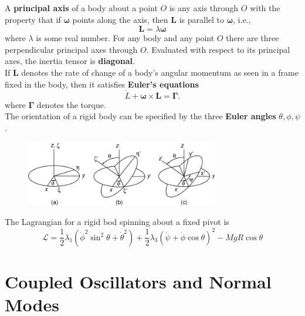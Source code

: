 \documentclass{book}
\theoremstyle{definition}
\newcommand{\lag}{\mathcal{L}}
\newcommand{\f}[2]{\frac{#1}{#2}}
\begin{document}
A \textbf{principal axis} of a body about a point $O$ is any axis through $O$ with the property that if $\mathbf{\omega}$ points along the axis, then $\mathbf{L}$ is parallel to $\mathbf{\omega}$, i.e., 
\begin{equation*}
\mathbf{L} = \lambda \mathbf{\omega}
\end{equation*}
where $\lambda$ is some real number. For any body and any point $O$ there are three perpendicular principal axes through $O$. Evaluated with respect to its principal axes, the inertia tensor is \textbf{diagonal}. \\


If $\dot{\mathbf{L}}$ denotes the rate of change of a body's angular momentum as seen in a frame fixed in the body, then it satisfies \textbf{Euler's equations}
\begin{equation*}
\dot{L}+ \mathbf{\omega} \times \mathbf{L} = \mathbf{\Gamma}.
\end{equation*}
where $\mathbf{\Gamma}$ denotes the torque. \\


The orientation of a rigid body can be specified by the three \textbf{Euler angles} $\theta, \phi,\psi$. \\

\begin{figure}[!htb]
	\centering
	\includegraphics[width=0.75\textwidth]{images/euler-angles}
\end{figure}

The Lagrangian for a rigid bod spinning about a fixed pivot is 
\begin{equation*}
\lag = \f{1}{2}\lambda_1(\dot{\phi}^2\sin^2\theta + \dot{\theta}^2) + \f{1}{2}\lambda_3(\dot{\psi} + \dot{\phi}\cos\theta)^2 - MgR\cos\theta
\end{equation*}








\section{Coupled Oscillators and Normal Modes}
\end{document}
